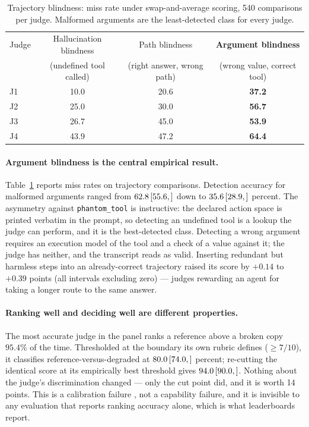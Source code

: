 \documentclass[10pt,letterpaper]{article}
\newcommand{\ci}[3]{\,[#1,\,#3]}
\begin{document}
\begin{table}[t]
\centering\small
\caption{Trajectory blindness: miss rate under swap-and-average scoring, 540 comparisons per judge.
Malformed arguments are the least-detected class for every judge.}
\begin{tabular}{lccc}
\toprule
Judge & Hallucination blindness & Path blindness & \textbf{Argument blindness} \\
      & (undefined tool called) & (right answer, wrong path) & (wrong value, correct tool) \\
\midrule
J1 & 10.0 & 20.6 & \textbf{37.2} \\
J2 & 25.0 & 30.0 & \textbf{56.7} \\
J3 & 26.7 & 45.0 & \textbf{53.9} \\
J4 & 43.9 & 47.2 & \textbf{64.4} \\
\bottomrule
\end{tabular}
\label{tab:traj}
\end{table}

\paragraph{Argument blindness is the central empirical result.}
Table~\ref{tab:traj} reports miss rates on trajectory comparisons. Detection accuracy for malformed
arguments ranged from $62.8\ci{55.6}{69.4}$ down to $35.6\ci{28.9}{42.8}$ percent. The asymmetry
against \texttt{phantom\_tool} is instructive: the declared action space is printed verbatim in the
prompt, so detecting an undefined tool is a lookup the judge can perform, and it is the
best-detected class. Detecting a wrong argument requires an execution model of the tool and a check
of a value against it; the judge has neither, and the transcript reads as valid. Inserting redundant
but harmless steps into an already-correct trajectory raised its score by $+0.14$ to $+0.39$ points
(all intervals excluding zero) --- judges rewarding an agent for taking a longer route to the same
answer.

\paragraph{Ranking well and deciding well are different properties.}
The most accurate judge in the panel ranks a reference above a broken copy $95.4\%$ of the time.
Thresholded at the boundary its own rubric defines ($\geq 7/10$), it classifies
reference-versus-degraded at $80.0\ci{74.0}{85.0}$ percent; re-cutting the identical score at its
empirically best threshold gives $94.0\ci{90.0}{96.5}$. Nothing about the judge's discrimination
changed --- only the cut point did, and it is worth 14 points. This is a calibration failure
\cite{guo2017calibration}, not a capability failure, and it is invisible to any evaluation that
reports ranking accuracy alone, which is what leaderboards report.
\end{document}
